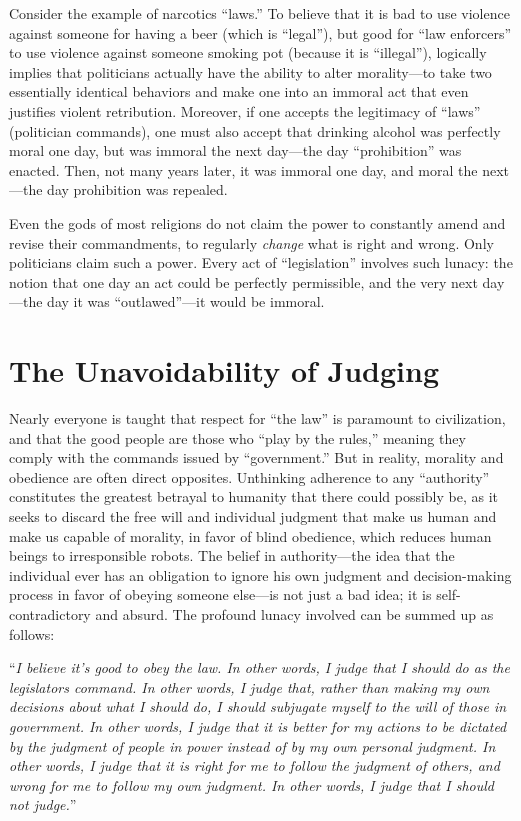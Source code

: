 \documentclass{book}
\begin{document}
Consider the example of narcotics \enquote{laws.} To believe that it is bad to use violence against someone for having a beer (which is \enquote{legal}), but good for \enquote{law enforcers} to use violence against someone smoking pot (because it is \enquote{illegal}), logically implies that politicians actually have the ability to alter morality---to take two essentially identical behaviors and make one into an immoral act that even justifies violent retribution. Moreover, if one accepts the legitimacy of \enquote{laws} (politician commands), one must also accept that drinking alcohol was perfectly moral one day, but was immoral the next day---the day \enquote{prohibition} was enacted. Then, not many years later, it was immoral one day, and moral the next---the day prohibition was repealed.

Even the gods of most religions do not claim the power to constantly amend and revise their commandments, to regularly \emph{change} what is right and wrong. Only politicians claim such a power. Every act of \enquote{legislation} involves such lunacy: the notion that one day an act could be perfectly permissible, and the very next day---the day it was \enquote{outlawed}---it would be immoral.

\section{The Unavoidability of Judging}

Nearly everyone is taught that respect for \enquote{the law} is paramount to civilization, and that the good people are those who \enquote{play by the rules,} meaning they comply with the commands issued by \enquote{government.} But in reality, morality and obedience are often direct opposites. Unthinking adherence to any \enquote{authority} constitutes the greatest betrayal to humanity that there could possibly be, as it seeks to discard the free will and individual judgment that make us human and make us capable of morality, in favor of blind obedience, which reduces human beings to irresponsible robots. The belief in authority---the idea that the individual ever has an obligation to ignore his own judgment and decision-making process in favor of obeying someone else---is not just a bad idea; it is self-contradictory and absurd. The profound lunacy involved can be summed up as follows:

\enquote{\emph{I believe it's good to obey the law. In other words, I judge that I should do as the legislators command. In other words, I judge that, rather than making my own decisions about what I should do, I should subjugate myself to the will of those in government. In other words, I judge that it is better for my actions to be dictated by the judgment of people in power instead of by my own personal judgment. In other words, I judge that it is right for me to follow the judgment of others, and wrong for me to follow my own judgment. In other words, I judge that I should not judge.}}
\end{document}
